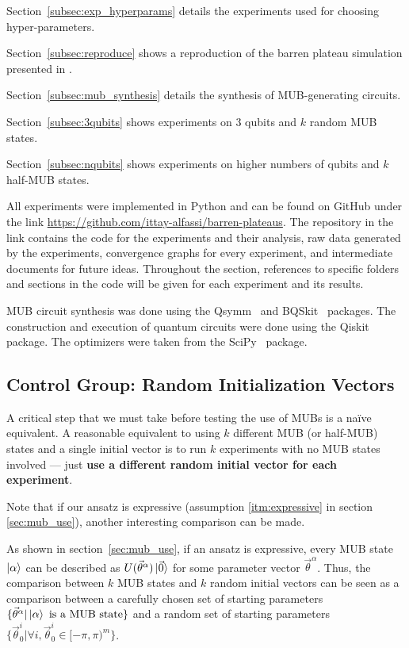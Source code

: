 \documentclass[a4paper,12pt]{article}
\newcommand{\thetas}{\vec{\theta}}
\begin{document}
Section~\ref{subsec:exp_hyperparams} details the experiments used for choosing hyper-parameters.

Section~\ref{subsec:reproduce} shows a reproduction of the barren plateau simulation presented in \cite{arrasmith_effect_2021}.

Section~\ref{subsec:mub_synthesis} details the synthesis of MUB-generating circuits.

Section~\ref{subsec:3qubits} shows experiments on 3 qubits and $k$ random MUB states.

Section~\ref{subsec:nqubits} shows experiments on higher numbers of qubits and $k$ half-MUB states.

All experiments were implemented in Python and can be found on GitHub under the link \url{https://github.com/ittay-alfassi/barren-plateaus}.
The repository in the link contains the code for the experiments and their analysis, raw data generated by the experiments, convergence graphs for every experiment, and intermediate documents for future ideas.
Throughout the section, references to specific folders and sections in the code will be given for each experiment and its results.

MUB circuit synthesis was done using the Qsymm~\cite{qsymm} and BQSkit~\cite{bqskit} packages.
The construction and execution of quantum circuits were done using the Qiskit~\cite{qiskit} package.
The optimizers were taken from the SciPy~\cite{scipy} package.

\subsection{Control Group: Random Initialization Vectors} \label{meth:random_thetas}
A critical step that we must take before testing the use of MUBs is a na{\"i}ve equivalent.
A reasonable equivalent to using $k$ different MUB (or half-MUB) states and a single initial vector is to run $k$ experiments with no MUB states involved --- just \textbf{use a different random initial vector for each experiment}.

Note that if our ansatz is expressive (assumption \ref{itm:expressive} in section \ref{sec:mub_use}), another interesting comparison can be made.

As shown in section~\ref{sec:mub_use}, if an ansatz is expressive, every MUB state $\ket{\alpha}$ can be described as $U(\thetas^\alpha)\ket{\vec{0}}$ for some parameter vector $\thetas^\alpha$.
Thus, the comparison between $k$ MUB states and $k$ random initial vectors can be seen as a comparison between a carefully chosen set of starting parameters $\{\thetas^{\alpha} | \ket{\alpha} \textrm{ is a MUB state}\}$ and a random set of starting parameters $\{\thetas_0^i | \forall i, \thetas_{0}^{i} \in [-\pi, \pi)^m\}$.
\end{document}
